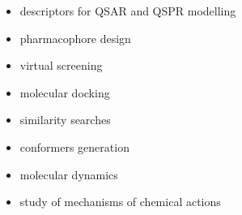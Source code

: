 \documentclass[oneside]{memoir}
\begin{document}
\begin{itemize}
\item descriptors for QSAR and QSPR modelling \cite{Svobodova2011, Varekova2013, Geidl2015, Dixon1993, Zhang2006, Gross2002, Ghafourian2000, Dudek2006, Karelson1996}
\item pharmacophore design \cite{Todeschini2008, Galvez1994, Stalke2011}
\item virtual screening \cite{Mannhold2006, Macdougall2007, Clement2000}
\item molecular docking \cite{Park2006, Nebgen2018, Rimac2017}
\item similarity searches \cite{Kearsley1996, Nikolova2003, Holliday2003}
\item conformers generation \cite{Vainio2007}
\item molecular dynamics \cite{Rappe1991, Chenoweth2008, Nejad2018, Lee2018}
\item study of mechanisms of chemical actions \cite{Ionescu2012, Rimac2017, Wheeler2019}
\end{itemize}

\printbibliography
\end{document}
